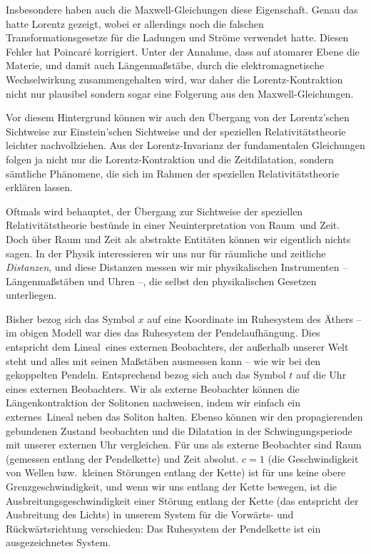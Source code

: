 Insbesondere haben auch die Maxwell-Gleichungen diese Eigenschaft.
Genau das hatte Lorentz gezeigt, wobei er allerdings noch die
falschen Transformationsgesetze f\"ur die Ladungen und Str\"ome
verwendet hatte. Diesen Fehler hat Poincar\'e korrigiert. Unter der 
Annahme, dass auf atomarer Ebene die 
Materie, und damit auch L\"angenma\ss st\"abe, durch die 
elektromagnetische Wechselwirkung zusammengehalten 
wird, war daher
die Lorentz-Kontraktion nicht nur plausibel sondern sogar eine
Folgerung aus den Maxwell-Gleichungen. 

Vor diesem Hintergrund k\"onnen wir auch den \"Ubergang
von der Lorentz'schen Sichtweise zur 
Einstein'schen Sichtweise und der 
speziellen Relativit\"atstheorie leichter nachvollziehen. 
Aus der Lorentz-Invarianz der fundamentalen Gleichungen
folgen ja nicht nur die Lorentz-Kontraktion und die Zeitdilatation,
sondern s\"amtliche Ph\"anomene, die sich im Rahmen der speziellen
Relativit\"atstheorie erkl\"aren lassen.

Oftmals wird behauptet, der \"Ubergang zur 
Sichtweise der speziellen Relativit\"atstheorie 
best\"unde in einer Neuinterpretation von 
\glqq Raum\grqq\ und \glqq Zeit\grqq.
Doch \"uber Raum und Zeit als abstrakte Entit\"aten 
k\"onnen wir eigentlich nichts sagen. In der Physik
interessieren wir uns nur f\"ur r\"aumliche und zeitliche
{\em Distanzen}, und diese Distanzen messen wir mir
physikalischen Instrumenten -- L\"angenma\ss st\"aben
und Uhren --, die selbst den physikalischen Gesetzen
unterliegen. 

Bisher bezog sich das Symbol $x$ auf 
eine Koordinate im Ruhesystem des
\"Athers -- im obigen Modell war dies das 
Ruhesystem der Pendelaufh\"angung. 
Dies entspricht dem \glqq Lineal\grqq\ eines 
externen Beobachters, der au\ss erhalb
unserer Welt steht und alles mit 
seinen Ma\ss st\"aben ausmessen kann -- 
wie wir bei den gekoppelten Pendeln. Entsprechend 
bezog sich auch das Symbol $t$ auf die Uhr eines externen Beobachters. Wir als
externe Beobachter k\"onnen die L\"angenkontraktion der Solitonen 
nachweisen, indem wir einfach ein \glqq externes\grqq\ 
Lineal neben das Soliton halten. Ebenso 
k\"onnen wir den propagierenden gebundenen Zustand beobachten und die 
Dilatation in der Schwingungsperiode 
mit unserer externen Uhr vergleichen. F\"ur uns als externe
Beobachter sind Raum (gemessen entlang der Pendelkette) und Zeit absolut. 
$c=1$ (die Geschwindigkeit von Wellen bzw.\ kleinen St\"orungen entlang der
Kette) ist f\"ur uns keine obere Grenzgeschwindigkeit, und wenn wir uns
entlang der Kette bewegen, ist die Ausbreitungsgeschwindigkeit einer
St\"orung entlang der Kette (das entspricht der Ausbreitung des Lichts)
in unserem System f\"{u}r die Vorw\"arts- und
R\"uckw\"artsrichtung verschieden: Das Ruhesystem der Pendelkette ist ein
ausgezeichnetes System.

